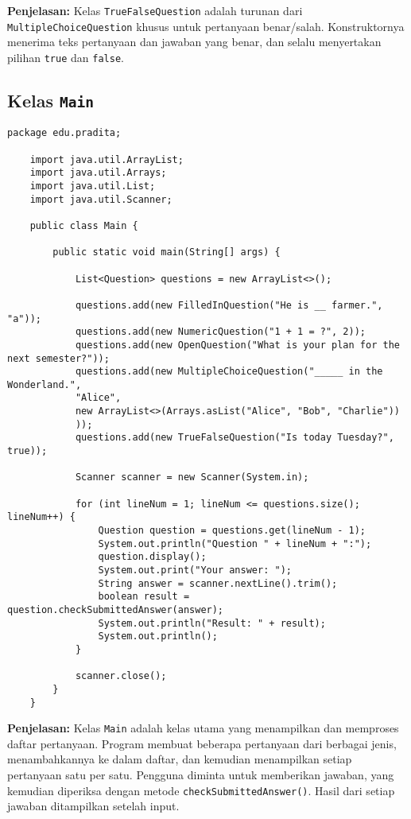 \textbf{Penjelasan:} Kelas \texttt{TrueFalseQuestion} adalah turunan dari \texttt{MultipleChoiceQuestion} khusus untuk pertanyaan benar/salah. Konstruktornya menerima teks pertanyaan dan jawaban yang benar, dan selalu menyertakan pilihan \texttt{true} dan \texttt{false}.

\subsection{Kelas \texttt{Main}}

\begin{lstlisting}[style=JavaStyle]
	package edu.pradita;
	
	import java.util.ArrayList;
	import java.util.Arrays;
	import java.util.List;
	import java.util.Scanner;
	
	public class Main {
		
		public static void main(String[] args) {
			
			List<Question> questions = new ArrayList<>();
			
			questions.add(new FilledInQuestion("He is __ farmer.", "a"));
			questions.add(new NumericQuestion("1 + 1 = ?", 2));
			questions.add(new OpenQuestion("What is your plan for the next semester?"));
			questions.add(new MultipleChoiceQuestion("_____ in the Wonderland.",
			"Alice",
			new ArrayList<>(Arrays.asList("Alice", "Bob", "Charlie"))
			));
			questions.add(new TrueFalseQuestion("Is today Tuesday?", true));
			
			Scanner scanner = new Scanner(System.in);
			
			for (int lineNum = 1; lineNum <= questions.size(); lineNum++) {
				Question question = questions.get(lineNum - 1);
				System.out.println("Question " + lineNum + ":");
				question.display();
				System.out.print("Your answer: ");
				String answer = scanner.nextLine().trim();
				boolean result = question.checkSubmittedAnswer(answer);
				System.out.println("Result: " + result);
				System.out.println();
			}
			
			scanner.close();
		}
	}
\end{lstlisting}

\textbf{Penjelasan:} Kelas \texttt{Main} adalah kelas utama yang menampilkan dan memproses daftar pertanyaan. Program membuat beberapa pertanyaan dari berbagai jenis, menambahkannya ke dalam daftar, dan kemudian menampilkan setiap pertanyaan satu per satu. Pengguna diminta untuk memberikan jawaban, yang kemudian diperiksa dengan metode \texttt{checkSubmittedAnswer()}. Hasil dari setiap jawaban ditampilkan setelah input.

